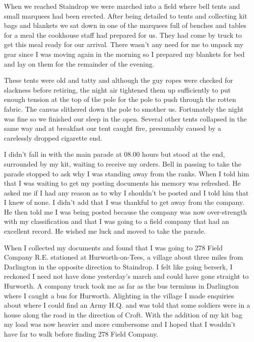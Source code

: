 When we reached Staindrop we were marched into a field where bell
tents and small marquees had been erected. After being detailed to
tents and collecting kit bags and blankets we sat down in one of the
marquees full of benches and tables for a meal the cookhouse staff had
prepared for us. They had come by truck to get this meal ready for
our arrival. There wasn't any need for me to unpack my gear since I
was moving again in the morning so I prepared my blankets for bed and
lay on them for the remainder of the evening.


These tents were old and tatty and although the guy ropes were checked
for slackness before retiring, the night air tightened them up
sufficiently to put enough tension at the top of the pole for the pole
to push through the rotten fabric. The canvas slithered down the pole
to smother us. Fortunately the night was fine so we finished our
sleep in the open. Several other tents collapsed in the same way and
at breakfast our tent caught fire, presumably caused by a carelessly
dropped cigarette end.

I didn't fall in with the main parade at 08.00 hours but stood at the
end, surrounded by my kit, waiting to receive my orders. \Major Bell
in passing to take the parade stopped to ask why I was standing away
from the ranks. When I told him that I was waiting to get my posting
documents his memory was refreshed. He asked me if I had any reason
as to why I shouldn't be posted and I told him that I knew of none. I
didn't add that I was thankful to get away from the company. He then
told me I was being posted because the company was now over-strength
with my classification and that I was going to a field company that
had an excellent record. He wished me luck and moved to take the
parade.

When I collected my documents and found that I was going to 278 Field
Company R.E. stationed at Hurworth-on-Tees, a village about three
miles from Darlington in the opposite direction to Staindrop. I felt
like going berserk, I reckoned I need not have done yesterday's march
and could have gone straight to Hurworth. A company truck took me as
far as the bus terminus in Darlington where I caught a bus for
Hurworth. Alighting in the village I made enquiries about where I
could find an Army H.Q. and was told that some soldiers were in a
house along the road in the direction of Croft. With the addition of
my kit bag my load was now heavier and more cumbersome and I hoped
that I wouldn't have far to walk before finding 278 Field Company.
